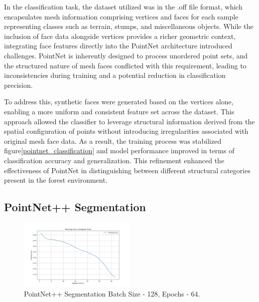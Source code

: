 \documentclass[../report.tex]{subfiles}
\begin{document}
    In the classification task, the dataset utilized was in the .off file format, which encapsulates mesh information comprising vertices and faces for each sample representing classes such as terrain, stumps, and miscellaneous objects. While the inclusion of face data alongside vertices provides a richer geometric context, integrating face features directly into the PointNet\cite{pointnetclass} architecture introduced challenges. PointNet is inherently designed to process unordered point sets, and the structured nature of mesh faces conflicted with this requirement, leading to inconsistencies during training and a potential reduction in classification precision.
    
    To address this, synthetic faces were generated based on the vertices alone, enabling a more uniform and consistent feature set across the dataset. This approach allowed the classifier to leverage structural information derived from the spatial configuration of points without introducing irregularities associated with original mesh face data. As a result, the training process was stabilized figure\ref{pointnet_classification} and model performance improved in terms of classification accuracy and generalization. This refinement enhanced the effectiveness of PointNet in distinguishing between different structural categories present in the forest environment.
    
\subsection{PointNet++ Segmentation}

\begin{figure}
    \centering
    \includegraphics[width=0.5\textwidth]{rnd-project-report-main/figures/PointNetSeg_output.png}
    \caption{PointNet++ Segmentation Batch Size - 128, Epochs - 64.}
    \label{fig:pointnetseg_bs128_ep64}
\end{figure}
\end{document}

